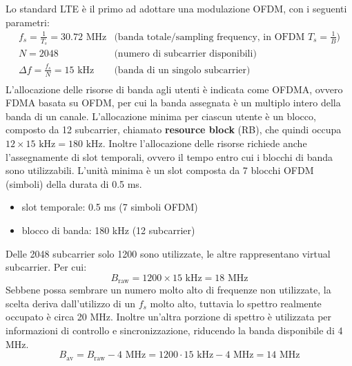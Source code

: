 Lo standard LTE è il primo ad adottare una modulazione OFDM, con i seguenti parametri:
\[
    \begin{array}{ll}
        f_s = \frac{1}{T_s} = 30.72 \text{ MHz} & \text{(banda totale/sampling frequency, in OFDM $T_s=\frac{1}{B}$)} \\
        N = 2048 & \text{(numero di subcarrier disponibili)} \\
        \Delta f = \frac{f_s}{N} = 15 \text{ kHz} & \text{(banda di un singolo subcarrier)} \\
    \end{array}    
\]
L'allocazione delle risorse di banda agli utenti è indicata come OFDMA, ovvero FDMA basata su OFDM, per cui la banda assegnata è un multiplo intero della banda di un canale.
L'allocazione minima per ciascun utente è un blocco, composto da 12 subcarrier, chiamato \textbf{resource block} (RB), che quindi occupa $12 \times 15 \text{ kHz} = 180 \text{ kHz}$.
Inoltre l'allocazione delle risorse richiede anche l'assegnamente di slot temporali, ovvero il tempo entro cui i blocchi di banda sono utilizzabili.
L'unità minima è un slot composta da 7 blocchi OFDM (simboli) della durata di 0.5 ms.
\begin{itemize}
    \item slot temporale: 0.5 ms (7 simboli OFDM) 
    \item blocco di banda: 180 kHz (12 subcarrier)
\end{itemize}
Delle 2048 subcarrier solo 1200 sono utilizzate, le altre rappresentano virtual subcarrier. Per cui:
\[
    B_{\text{raw}} = 1200 \times 15 \text{ kHz} = 18 \text{ MHz}  
\]
Sebbene possa sembrare un numero molto alto di frequenze non utilizzate, la scelta deriva dall'utilizzo di un $f_s$ molto alto, tuttavia lo spettro realmente occupato è circa 20 MHz.
Inoltre un'altra porzione di spettro è utilizzata per informazioni di controllo e sincronizzazione, riducendo la banda disponibile di 4 MHz.
\[
    B_{\text{av}} = B_{\text{raw}} - 4 \text{ MHz} = 1200 \cdot 15 \text{ kHz} - 4 \text{ MHz} = 14 \text{ MHz}
\]

